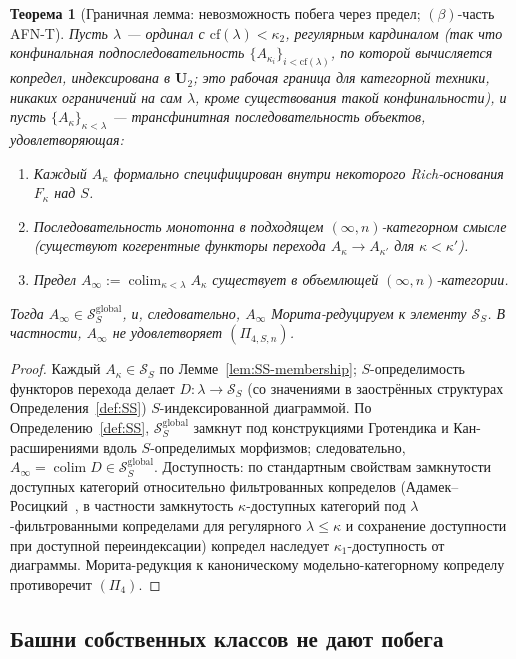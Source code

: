 \documentclass[11pt]{article}
\theoremstyle{plain}
\newtheorem{theorem}{Теорема}[section]
\theoremstyle{definition}
\newcommand{\cS}{\mathcal{S}}
\DeclareMathOperator{\colim}{colim}
\begin{document}
\begin{theorem}[Граничная лемма: невозможность побега через предел; $(\beta)$-часть AFN-T]\label{thm:afnt-beta}
Пусть $\lambda$ — ординал с $\mathrm{cf}(\lambda) < \kappa_2$, регулярным кардиналом (так что конфинальная подпоследовательность $\{A_{\kappa_i}\}_{i < \mathrm{cf}(\lambda)}$, по которой вычисляется копредел, индексирована в $\mathbf{U}_2$; это рабочая граница для категорной техники, никаких ограничений на сам $\lambda$, кроме существования такой конфинальности), и пусть $\{A_\kappa\}_{\kappa < \lambda}$ — трансфинитная последовательность объектов, удовлетворяющая:
\begin{enumerate}[label=(\roman*)]
\item Каждый $A_\kappa$ формально специфицирован внутри некоторого Rich-основания $F_\kappa$ над $S$.
\item Последовательность монотонна в подходящем $(\infty, n)$-категорном смысле (существуют когерентные функторы перехода $A_\kappa \to A_{\kappa'}$ для $\kappa < \kappa'$).
\item Предел $A_\infty := \colim_{\kappa < \lambda} A_\kappa$ существует в объемлющей $(\infty, n)$-категории.
\end{enumerate}
Тогда $A_\infty \in \cS_S^{\mathrm{global}}$, и, следовательно, $A_\infty$ Морита-редуцируем к элементу $\cS_S$. В частности, $A_\infty$ не удовлетворяет $(\Pi_{4, S, n})$.
\end{theorem}

\begin{proof}
Каждый $A_\kappa \in \cS_S$ по Лемме~\ref{lem:SS-membership}; $S$-определимость функторов перехода делает $D : \lambda \to \cS_S$ (со значениями в заострённых структурах Определения~\ref{def:SS}) $S$-индексированной диаграммой. По Определению~\ref{def:SS}, $\cS_S^{\mathrm{global}}$ замкнут под конструкциями Гротендика и Кан-расширениями вдоль $S$-определимых морфизмов; следовательно, $A_\infty = \colim D \in \cS_S^{\mathrm{global}}$. Доступность: по стандартным свойствам замкнутости доступных категорий относительно фильтрованных копределов (Адамек--Росицкий~\cite{AdamekRosicky1994}, в частности замкнутость $\kappa$-доступных категорий под $\lambda$-фильтрованными копределами для регулярного $\lambda \leq \kappa$ и сохранение доступности при доступной переиндексации) копредел наследует $\kappa_1$-доступность от диаграммы. Морита-редукция к каноническому модельно-категорному копределу противоречит $(\Pi_4)$.
\end{proof}

\subsection{Башни собственных классов не дают побега}
\end{document}
